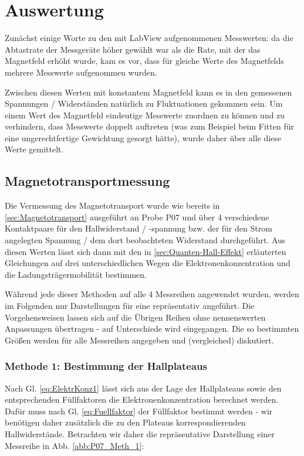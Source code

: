 \section{Auswertung}

Zunächst einige Worte zu den mit LabView aufgenommenen Messwerten: da die Abtastrate der Messgeräte höher gewählt war als die Rate, mit der das Magnetfeld erhöht wurde, kam es vor, dass für gleiche Werte des Magnetfelds mehrere Messwerte aufgenommen wurden.

Zwischen diesen Werten mit konstantem Magnetfeld kann es in den gemessenen Spannungen / Widerständen natürlich zu Fluktuationen gekommen sein. Um einem Wert des Magnetfeld eindeutige Messwerte zuordnen zu können und zu verhindern, dass Messwerte doppelt auftreten (was zum Beispiel beim Fitten für eine ungerechtfertige Gewichtung gesorgt hätte), wurde daher über alle diese Werte gemittelt.

\subsection{Magnetotransportmessung}\label{sec:Mag_trans}
Die Vermessung des Magnetotransport wurde wie bereits in \autoref{sec:Magnetotransport} ausgeführt an Probe P07 und über 4 verschiedene Kontaktpaare für den Hallwiderstand / -spannung bzw. der für den Strom angelegten Spannung / dem dort beobachteten Widerstand durchgeführt. Aus diesen Werten lässt sich dann mit den in \autoref{sec:Quanten-Hall-Effekt} erläuterten Gleichungen auf drei unterschiedlichen Wegen die Elektronenkonzentration und die Ladungsträgermobilität bestimmen. 

Während jede dieser Methoden auf alle 4 Messreihen angewendet wurden, werden im Folgenden nur Darstellungen für eine repräsentativ angeführt. Die Vorgehensweisen lassen sich auf die Übrigen Reihen ohne nennenswerten Anpassungen übertragen - auf Unterschiede wird eingegangen. Die so bestimmten Größen werden für alle Messreihen angegeben und (vergleiched) diskutiert.

\subsubsection{Methode 1: Bestimmung der Hallplateaus}
Nach Gl. \ref{eq:ElektrKonz1} lässt sich aus der Lage der Hallplateaus sowie den entsprechenden Füllfaktoren die Elektronenkonzentration berechnet werden. Dafür muss nach Gl. \ref{eq:Fuellfaktor} der Füllfaktor bestimmt werden - wir benötigen daher zusätzlich die zu den Plateaus korrespondierenden Hallwiderstände.  Betrachten wir daher die repräsentative Darstellung einer Messreihe in Abb. \ref{abb:P07_Meth_1}:

